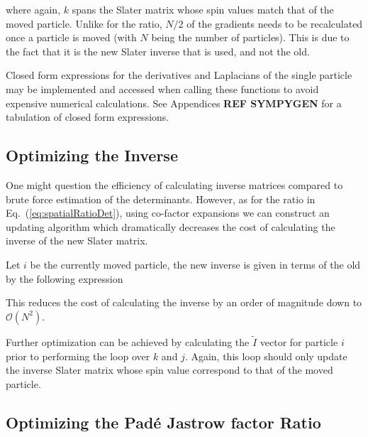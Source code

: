 where again, $k$ spans the Slater matrix whose spin values match that of the moved particle. Unlike for the ratio, $N/2$ of the gradients needs to be recalculated once a particle is moved (with $N$ being the number of particles). This is due to the fact that it is the new Slater inverse that is used, and not the old.

Closed form expressions for the derivatives and Laplacians of the single particle may be implemented and accessed when calling these functions to avoid expensive numerical calculations. See Appendices \textbf{REF SYMPYGEN} for a tabulation of closed form expressions.

\subsection{Optimizing the Inverse}
\label{sec:optInv}

One might question the efficiency of calculating inverse matrices compared to brute force estimation of the determinants. However, as for the ratio in Eq.~(\ref{eq:spatialRatioDet}), using co-factor expansions we can construct an updating algorithm which dramatically decreases the cost of calculating the inverse of the new Slater matrix.

Let $i$ be the currently moved particle, the new inverse is given in terms of the old by the following expression \cite{abInitioMC, morten}


This reduces the cost of calculating the inverse by an order of magnitude down to $\mathcal{O}(N^2)$.

Further optimization can be achieved by calculating the $\tilde I$ vector for particle $i$ prior to performing the loop over $k$ and $j$. Again, this loop should only update the inverse Slater matrix whose spin value correspond to that of the moved particle.

\subsection{Optimizing the Padé Jastrow factor Ratio}

